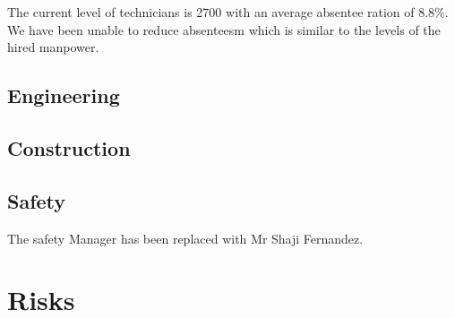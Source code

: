 \documentclass[border=5mm,twocolumn]{report}
\begin{document}
The current level of technicians is 2700 with an average absentee ration of 8.8\%. We have been unable to reduce absenteesm which is similar to the levels of the hired manpower. 

\subsection{Engineering}

\subsection{Construction}

\subsection{Safety}

The safety Manager has been replaced with Mr Shaji Fernandez.

\section{Risks}



\lipsum
\end{document}

